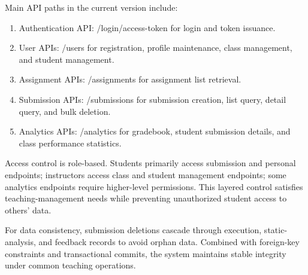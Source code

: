 Main API paths in the current version include:

\begin{enumerate}
\item Authentication API: /login/access-token for login and token issuance.
\item User APIs: /users for registration, profile maintenance, class management, and student management.
\item Assignment APIs: /assignments for assignment list retrieval.
\item Submission APIs: /submissions for submission creation, list query, detail query, and bulk deletion.
\item Analytics APIs: /analytics for gradebook, student submission details, and class performance statistics.
\end{enumerate}


Access control is role-based. Students primarily access submission and personal endpoints; instructors access class and student management endpoints; some analytics endpoints require higher-level permissions. This layered control satisfies teaching-management needs while preventing unauthorized student access to others' data.

For data consistency, submission deletions cascade through execution, static-analysis, and feedback records to avoid orphan data. Combined with foreign-key constraints and transactional commits, the system maintains stable integrity under common teaching operations.


